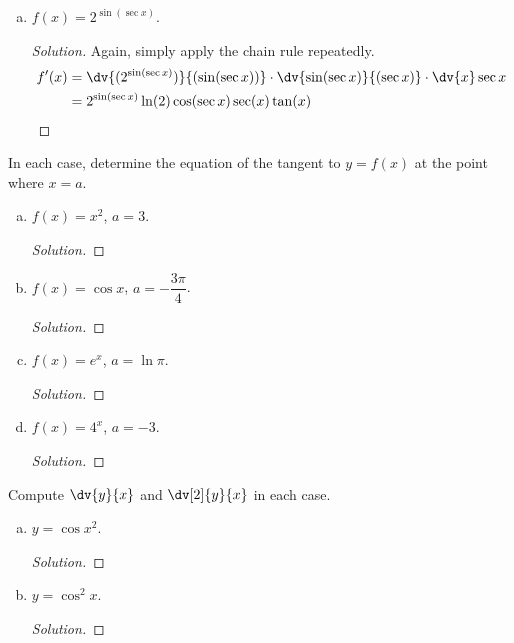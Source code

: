 \begin{enumerate}[(a)]
\begin{proof}[Solution]
\begin{align*}
             & = \frac{2\tan x \sec^2x}{\sqrt{2\tan^2x+3}} \qedhere
          \end{align*}
        \end{proof}
  \item $f(x)=2^{\sin(\sec x)}$.
        \begin{proof}[Solution]
          Again, simply apply the chain rule repeatedly.
          \begin{align*}
            f'(x)
             & = \dv{(2^{\sin(\sec x)})}{(\sin(\sec x))}\cdot\dv{\sin(\sec x)}{(\sec x)}\cdot\dv{x}\sec x \\
             & = 2^{\sin(\sec x)}\ln(2)\cos(\sec x)\sec(x)\tan(x) \qedhere
          \end{align*}
        \end{proof}
\end{enumerate}


\question In each case, determine the equation of the tangent to $y=f(x)$ at the point where $x=a$.
\begin{enumerate}[(a)]
  \item $f(x)=x^2$, $a=3$.
        \begin{proof}[Solution]
        \end{proof}
  \item $f(x)=\cos x$, $a=-\dfrac{3\pi}{4}$.
        \begin{proof}[Solution]
        \end{proof}
  \item $f(x)=e^x$, $a=\ln\pi$.
        \begin{proof}[Solution]
        \end{proof}
  \item $f(x)=4^x$, $a=-3$.
        \begin{proof}[Solution]
        \end{proof}
\end{enumerate}


\question Compute $\displaystyle\dv{y}{x}$ and $\displaystyle\dv[2]{y}{x}$ in each case.
\begin{enumerate}[(a)]
  \item $y=\cos x^2$.
        \begin{proof}[Solution]
        \end{proof}
  \item $y=\cos^2 x$.
        \begin{proof}[Solution]
        \end{proof}
\end{enumerate}


